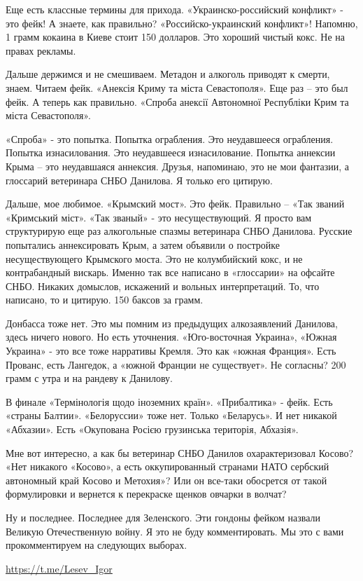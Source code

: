 Еще есть классные термины для прихода. «Украинско-российский конфликт» - это
фейк! А знаете, как правильно? «Российско-украинский конфликт»! Напомню, 1
грамм кокаина в Киеве стоит 150 долларов. Это хороший чистый кокс. Не на правах
рекламы.

Дальше держимся и не смешиваем. Метадон и алкоголь приводят к смерти, знаем.
Читаем фейк. «Анексія Криму та міста Севастополя». Еще раз – это был фейк. А
теперь как правильно. «Спроба анексії Автономної Республіки Крим та міста
Севастополя».

«Спроба» - это попытка. Попытка ограбления. Это неудавшееся ограбления. Попытка
изнасилования. Это неудавшееся изнасилование. Попытка аннексии Крыма – это
неудавшаяся аннексия. Друзья, напоминаю, это не мои фантазии, а глоссарий
ветеринара СНБО Данилова. Я только его цитирую.

Дальше, мое любимое. «Крымский мост». Это фейк. Правильно – «Так званий
«Кримський міст». «Так званый» - это несуществующий. Я просто вам структурирую
еще раз алкогольные спазмы ветеринара СНБО Данилова. Русские попытались
аннексировать Крым, а затем объявили о постройке несуществующего Крымского
моста. Это не колумбийский кокс, и не контрабандный вискарь. Именно так все
написано в «глоссарии» на офсайте СНБО. Никаких домыслов, искажений и вольных
интерпретаций. То, что написано, то и цитирую. 150 баксов за грамм.

Донбасса тоже нет. Это мы помним из предыдущих алкозаявлений Данилова, здесь
ничего нового. Но есть уточнения. «Юго-восточная Украина», «Южная Украина» -
это все тоже нарративы Кремля. Это как «южная Франция». Есть Прованс, есть
Лангедок, а «южной Франции не существует». Не согласны? 200 грамм с утра и на
рандеву к Данилову.

В финале «Термінологія щодо іноземних країн». «Прибалтика» - фейк. Есть «страны
Балтии». «Белоруссии» тоже нет. Только «Беларусь». И нет никакой «Абхазии».
Есть «Окупована Росією грузинська територія, Абхазія».

Мне вот интересно, а как бы ветеринар СНБО Данилов охарактеризовал Косово? «Нет
никакого «Косово», а есть оккупированный странами НАТО сербский автономный край
Косово и Метохия»? Или он все-таки обосрется от такой формулировки и вернется к
перекраске щенков овчарки в волчат?

Ну и последнее. Последнее для Зеленского. Эти гондоны фейком назвали Великую
Отечественную войну. Я это не буду комментировать. Мы это с вами
прокомментируем на следующих выборах.

\url{https://t.me/Lesev_Igor}

